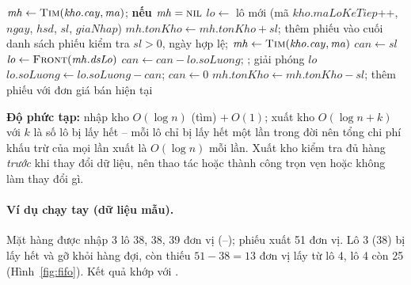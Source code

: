 \begin{algorithm}[htbp]
\caption{Nhập kho và xuất kho theo FIFO (, )}\label{alg:fifo}
\begin{algorithmic}[1]
   \State \Return {} \EndIf
  \State $\mathit{mh} \gets \Call{Tim}{\mathit{kho}.\mathit{cay}, \mathit{ma}}$; \textbf{nếu} $\mathit{mh} = \textsc{nil}$ \Return {}
  \State $\mathit{lo} \gets$ lô mới (mã $\mathit{kho}.\mathit{maLoKeTiep}$++, $\mathit{ngay}$, $\mathit{hsd}$, $\mathit{sl}$, $\mathit{giaNhap}$)
  \State {} 
  \State $\mathit{mh}.\mathit{tonKho} \gets \mathit{mh}.\mathit{tonKho} + \mathit{sl}$; thêm phiếu  vào cuối danh sách phiếu
\EndFunction
\Statex
{}
  \State kiểm tra $\mathit{sl} > 0$, ngày hợp lệ; $\mathit{mh} \gets \Call{Tim}{\mathit{kho}.\mathit{cay}, \mathit{ma}}$
   \State \Return {} \EndIf
  \State $\mathit{can} \gets \mathit{sl}$
    \State $\mathit{lo} \gets \Call{Front}{\mathit{mh}.\mathit{dsLo}}$ 
      \State $\mathit{can} \gets \mathit{can} - \mathit{lo}.\mathit{soLuong}$; ; giải phóng $\mathit{lo}$
    \Else \State $\mathit{lo}.\mathit{soLuong} \gets \mathit{lo}.\mathit{soLuong} - \mathit{can}$; $\mathit{can} \gets 0$
    \EndIf
  \EndWhile
  \State $\mathit{mh}.\mathit{tonKho} \gets \mathit{mh}.\mathit{tonKho} - \mathit{sl}$; thêm phiếu  với đơn giá bán hiện tại
\EndFunction
\end{algorithmic}
\end{algorithm}

\textbf{Độ phức tạp:} nhập kho $O(\log n)$ (tìm) $+\ O(1)$; xuất kho $O(\log n + k)$ với $k$ là số lô bị lấy
hết -- mỗi lô chỉ bị lấy hết một lần trong đời nên tổng chi phí khấu trừ của mọi lần xuất là $O(\log n)$ mỗi lần.
Xuất kho kiểm tra đủ hàng \emph{trước} khi thay đổi dữ liệu, nên thao tác hoặc thành công trọn vẹn hoặc không
làm thay đổi gì.

\paragraph{Ví dụ chạy tay (dữ liệu mẫu).} Mặt hàng  được nhập 3 lô 38, 38, 39 đơn vị
(--); phiếu  xuất 51 đơn vị. Lô 3 (38) bị lấy hết và gỡ khỏi hàng đợi,
còn thiếu $51-38 = 13$ đơn vị lấy từ lô 4, lô 4 còn 25 (Hình~\ref{fig:fifo}). Kết quả khớp với .

